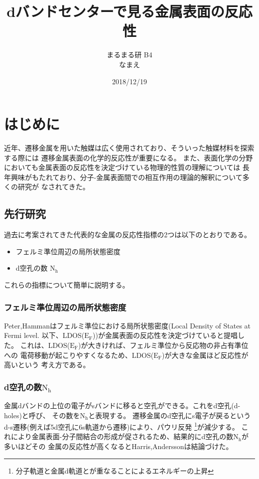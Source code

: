 \documentclass[12pt]{ltjsarticle}
\begin{document}
\begin{titlepage}
\title{dバンドセンターで見る金属表面の反応性}
\author{まるまる研 B4 \\ なまえ}
\date{2018/12/19}
\maketitle
\tableofcontents
\end{titlepage}

\section{はじめに}
近年、遷移金属を用いた触媒は広く使用されており、そういった触媒材料を探索する際には
遷移金属表面の化学的反応性が重要になる。
また、表面化学の分野においても金属表面の反応性を決定づけている物理的性質の理解については
長年興味がもたれており、分子-金属表面間での相互作用の理論的解釈について多くの研究が
なされてきた。 

\subsection{先行研究}

過去に考案されてきた代表的な金属の反応性指標の2つは以下のとおりである。
\begin{itemize}
 \item フェルミ準位周辺の局所状態密度
 \item d空孔の数 $\text{N}_\text{h}$
\end{itemize}
これらの指標について簡単に説明する。

\subsubsection{フェルミ準位周辺の局所状態密度}
Peter,Hammanはフェルミ準位における局所状態密度(Local Density of States at Fermi level.
以下、LDOS($\text{E}_\text{F}$))が金属表面の反応性を決定づけていると提唱した。
これは、LDOS($\text{E}_\text{F}$)が大きければ、フェルミ準位から反応物の非占有準位への
電荷移動が起こりやすくなるため、LDOS($\text{E}_\text{F}$)が大きな金属ほど反応性が高いという
考え方である。\cite{PeterJ.Feibelman1984}

\subsubsection{d空孔の数$\text{N}_\text{h}$}
金属dバンドの上位の電子がsバンドに移ると空孔ができる。これをd空孔(d-holes)と呼び、
その数を$\text{N}_\text{h}$と表現する。
遷移金属のd空孔にs電子が戻るというd-s遷移(例えば5d空孔に6s軌道から遷移)により、パウリ反発
\footnote{分子軌道と金属d軌道とが重なることによるエネルギーの上昇}が減少する。\cite{MORIKAWA2006}
これにより金属表面-分子間結合の形成が促されるため、結果的にd空孔の数$\text{N}_\text{h}$が多いほどその
金属の反応性が高くなるとHarris,Anderssonは結論づけた。\cite{J.Harris1985}
\end{document}
